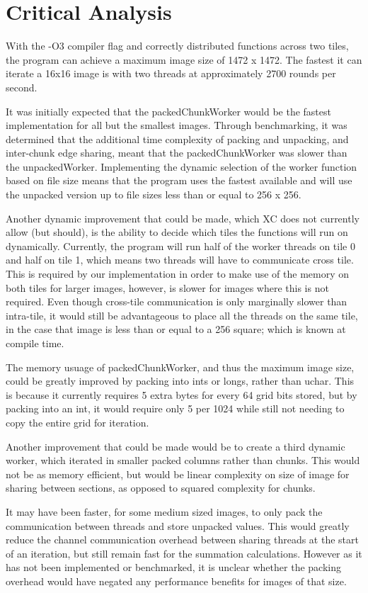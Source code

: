 \documentclass[11pt, oneside]{article}
\begin{document}
\pagebreak
\section{Critical Analysis}
With the -O3 compiler flag and correctly distributed functions across two tiles, the program can achieve a maximum image size of 1472 x 1472. The fastest it can iterate a 16x16 image is with two threads at approximately 2700 rounds per second.

It was initially expected that the packedChunkWorker would be the fastest implementation for all but the smallest images. Through benchmarking, it was determined that the additional time complexity of packing and unpacking, and inter-chunk edge sharing, meant that the packedChunkWorker was slower than the unpackedWorker. Implementing the dynamic selection of the worker function based on file size means that the program uses the fastest available and will use the unpacked version up to file sizes less than or equal to 256 x 256.

Another dynamic improvement that could be made, which XC does not currently allow (but should), is the ability to decide which tiles the functions will run on dynamically. Currently, the program will run half of the worker threads on tile 0 and half on tile 1, which means two threads will have to communicate cross tile. This is required by our implementation in order to make use of the memory on both tiles for larger images, however, is slower for images where this is not required. Even though cross-tile communication is only marginally slower than intra-tile, it would still be advantageous to place all the threads on the same tile, in the case that image is less than or equal to a 256 square; which is known at compile time.

The memory usuage of packedChunkWorker, and thus the maximum image size, could be greatly improved by packing into ints or longs, rather than uchar. This is because it currently requires 5 extra bytes for every 64 grid bits stored, but by packing into an int, it would require only 5 per 1024 while still not needing to copy the entire grid for iteration.

Another improvement that could be made would be to create a third dynamic worker, which iterated in smaller packed columns rather than chunks. This would not be as memory efficient, but would be linear complexity on size of image for sharing between sections, as opposed to squared complexity for chunks.

It may have been faster, for some medium sized images, to only pack the communication between threads and store unpacked values. This would greatly reduce the channel communication overhead between sharing threads at the start of an iteration, but still remain fast for the summation calculations. However as it has not been implemented or benchmarked, it is unclear whether the packing overhead would have negated any performance benefits for images of that size.
\end{document}
